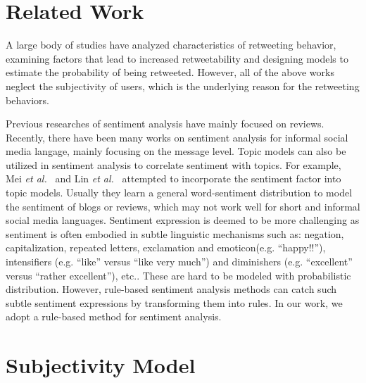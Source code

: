 \documentclass[letterpaper]{article}
\begin{document}
\section{Related Work}
\label{relatedwork}
   
A large body of studies have analyzed characteristics of retweeting behavior\cite{Bian2014,Luo:2013RMF}, examining factors that lead to increased retweetability\cite{suh2010want,comarela2012understanding} and designing models to estimate the probability of being retweeted\cite{jenders2013analyzing,pfitzner2012emotional}. However, all of the above works neglect the subjectivity of users, which is the underlying reason for the retweeting behaviors. 

Previous researches of sentiment analysis have mainly focused on reviews\cite{liu2012sentiment}. 
Recently, there have been many works on sentiment analysis for informal social media langage, mainly focusing on the message level\cite{jiang2011target,tan2011user,Guerra2014}. Topic models can also be utilized in sentiment analysis to correlate sentiment with topics. For example, Mei \emph{et al.}~\cite{mei2007topic} and Lin \emph{et al.}~\cite{lin2009joint} attempted to incorporate the sentiment factor into topic models. Usually they learn a general word-sentiment distribution to model the sentiment of blogs or reviews, which may not work well for short and informal social media languages. Sentiment expression is deemed to be more challenging as sentiment is often embodied in subtle linguistic mechanisms such as: negation, capitalization, repeated letters, exclamation and emoticon(e.g. ``happy!!''), intensifiers (e.g. ``like'' versus ``like very much'') and diminishers (e.g. ``excellent'' versus ``rather excellent''), etc.\cite{brody2011col}. These are hard to be modeled with probabilistic distribution. However, rule-based sentiment analysis methods can catch such subtle sentiment expressions by transforming them into rules\cite{thelwall2010sentiment}. In our work, we adopt a rule-based method for sentiment analysis.

\section{Subjectivity Model}
\label{subjectivemodel}
\end{document}
